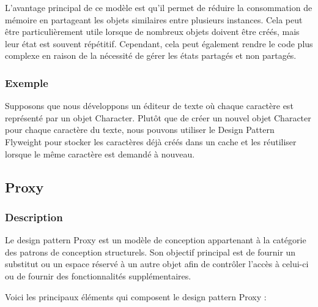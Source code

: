 \documentclass[french]{article}
\begin{document}
L'avantage principal de ce modèle est qu'il permet de réduire la consommation de mémoire en partageant les objets similaires entre plusieurs instances. Cela peut être particulièrement utile lorsque de nombreux objets doivent être créés, mais leur état est souvent répétitif. Cependant, cela peut également rendre le code plus complexe en raison de la nécessité de gérer les états partagés et non partagés.


\subsubsection{Exemple}

Supposons que nous développons un éditeur de texte où chaque caractère est représenté par un objet Character. Plutôt que de créer un nouvel objet Character pour chaque caractère du texte, nous pouvons utiliser le Design Pattern Flyweight pour stocker les caractères déjà créés dans un cache et les réutiliser lorsque le même caractère est demandé à nouveau.




\newpage

\subsection{Proxy}

\subsubsection{Description}

Le design pattern Proxy est un modèle de conception appartenant à la catégorie des patrons de conception structurels. Son objectif principal est de fournir un substitut ou un espace réservé à un autre objet afin de contrôler l'accès à celui-ci ou de fournir des fonctionnalités supplémentaires.

Voici les principaux éléments qui composent le design pattern Proxy :
\end{document}
